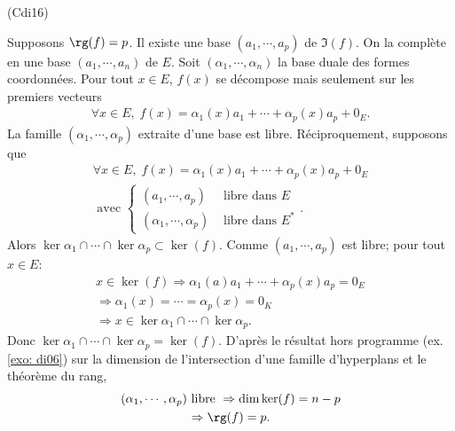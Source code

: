 \begin{tiny}(Cdi16)\end{tiny} Supposons $\rg(f) = p$.\newline
Il existe une base $(a_1,\cdots,a_p)$ de $\Im(f)$. On la complète en une base $(a_1,\cdots, a_n)$ de $E$. Soit $(\alpha_1,\cdots,\alpha_n)$ la base duale des formes coordonnées. Pour tout $x\in E$, $f(x)$ se décompose mais seulement sur les premiers vecteurs
\begin{multline*}
 \forall x \in E, \; f(x) 
 = \alpha_1(x)a_1 + \cdots + \alpha_p(x)a_p + 0_E. 
\end{multline*}
La famille $(\alpha_1,\cdots,\alpha_p)$ extraite d'une base est libre.\newline
Réciproquement, supposons que
\begin{multline*}
  \forall x \in E, \; f(x) 
 = \alpha_1(x)a_1 + \cdots + \alpha_p(x)a_p + 0_E \\
 \text{ avec }
 \left\lbrace 
 \begin{aligned}
  (a_1,\cdots,a_p) &\text{ libre dans } E\\
  (\alpha_1,\cdots,\alpha_p) &\text{ libre dans } E^*
 \end{aligned}
\right. .
\end{multline*}
Alors $\ker \alpha_1 \cap \cdots \cap \ker \alpha_p \subset \ker(f)$.\newline
Comme $(a_1,\cdots,a_p)$ est libre; pour tout $x\in E$:
\begin{multline*}
 x\in \ker(f) 
 \Rightarrow \alpha_1(a)a_1 + \cdots + \alpha_p(x)a_p = 0_E\\
 \Rightarrow \alpha_1(x) = \cdots = \alpha_p(x) = 0_K\\
 \Rightarrow x \in \ker \alpha_1 \cap \cdots \cap \ker \alpha_p.
\end{multline*}
Donc $\ker \alpha_1 \cap \cdots \cap \ker \alpha_p = \ker(f)$.\newline
D'après le résultat hors programme (ex. \ref{exo: di06}) sur la dimension de l'intersection d'une famille d'hyperplans et le théorème du rang,
\begin{multline*}
(\alpha_1,\cdots,\alpha_p)\text{ libre }
\Rightarrow \dim \ker(f) = n-p \\
\Rightarrow \rg(f) = p .
\end{multline*}
